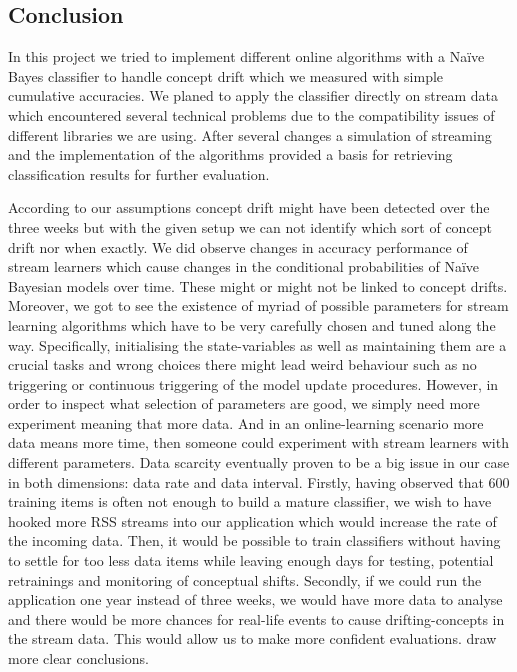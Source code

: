 \documentclass{article} %
\begin{document}
\subsection{Conclusion}
In this project we tried to implement different online algorithms with a Na\"ive Bayes classifier to handle concept drift which we measured with simple cumulative accuracies. We planed to apply the classifier directly on stream data which encountered several technical problems due to the compatibility issues of different libraries we are using. After several changes a simulation of streaming and the implementation of the algorithms provided a basis for retrieving classification results for further evaluation.   

According to our assumptions concept drift might have been detected over the three weeks but with the given setup we can not identify which sort of concept drift nor when exactly. We did observe changes in accuracy performance of stream learners which cause changes in the conditional probabilities of Na\"ive Bayesian models over time. These might or might not be linked to concept drifts. 
Moreover, we got to see the existence of myriad of possible parameters for stream learning algorithms which have to be very carefully chosen and tuned along the way. Specifically, initialising the state-variables as well as maintaining them are a crucial tasks and wrong choices there might lead weird behaviour such as no triggering or continuous triggering of the model update procedures. However, in order to inspect what selection of parameters are good, we simply need more experiment meaning that more data. And in an online-learning scenario more data means more time, then someone could experiment with stream learners with different parameters. Data scarcity eventually proven to be a big issue in our case in both dimensions: data rate and data interval. Firstly, having observed that 600 training items is often not enough to build a mature classifier, we wish to have hooked more RSS streams into our application which would increase the rate of the incoming data. Then, it would be possible to train classifiers without having to settle for too less data items while leaving enough days for testing, potential retrainings and monitoring of conceptual shifts. Secondly, if we could run the application one year instead of three weeks, we would have more data to analyse and there would be more chances for real-life events to cause drifting-concepts in the stream data. This would allow us to  make more confident evaluations. draw more clear conclusions.








\small{

}
\end{document}
